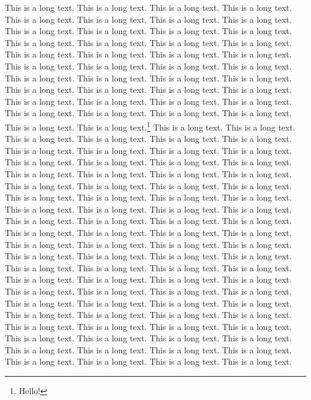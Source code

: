 \documentclass[twoside]{article}
\begin{document}
This is a long text. This is a long text.
This is a long text. This is a long text.
This is a long text. This is a long text.
This is a long text. This is a long text.
This is a long text. This is a long text.
This is a long text. This is a long text.
This is a long text. This is a long text.
This is a long text. This is a long text.
This is a long text. This is a long text.
This is a long text. This is a long text.
This is a long text. This is a long text.
This is a long text. This is a long text.
This is a long text. This is a long text.
This is a long text. This is a long text.
This is a long text. This is a long text.
This is a long text. This is a long text.
This is a long text. This is a long text.
This is a long text. This is a long text.
This is a long text. This is a long text.
This is a long text. This is a long text.
This is a long text. This is a long text.\footnote{Hello!}
This is a long text. This is a long text.
This is a long text. This is a long text.
This is a long text. This is a long text.
This is a long text. This is a long text.
This is a long text. This is a long text.
This is a long text. This is a long text.
This is a long text. This is a long text.
This is a long text. This is a long text.
This is a long text. This is a long text.
This is a long text. This is a long text.
This is a long text. This is a long text.
This is a long text. This is a long text.
This is a long text. This is a long text.
This is a long text. This is a long text.
This is a long text. This is a long text.
This is a long text. This is a long text.
This is a long text. This is a long text.
This is a long text. This is a long text.
This is a long text. This is a long text.
This is a long text. This is a long text.
This is a long text. This is a long text.
This is a long text. This is a long text.
This is a long text. This is a long text.
This is a long text. This is a long text.
This is a long text. This is a long text.
This is a long text. This is a long text.
This is a long text. This is a long text.
This is a long text. This is a long text.
This is a long text. This is a long text.
This is a long text. This is a long text.
This is a long text. This is a long text.
This is a long text. This is a long text.
This is a long text. This is a long text.
This is a long text. This is a long text.
This is a long text. This is a long text.
This is a long text. This is a long text.
This is a long text. This is a long text.
This is a long text. This is a long text.
This is a long text. This is a long text.
This is a long text. This is a long text.
This is a long text. This is a long text.
\end{document}
